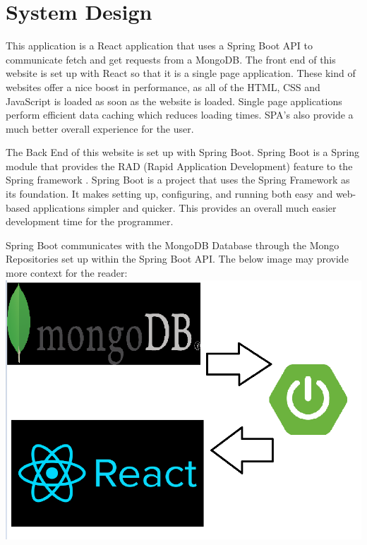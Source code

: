 \chapter{System Design}
This application is a React application that uses a Spring Boot API to communicate fetch and get requests from a MongoDB. The front end of this website is set up with React so that it is a single page application. These kind of websites offer a nice boost in performance, as all of the HTML, CSS and JavaScript is loaded as soon as the website is loaded. Single page applications perform efficient data caching which reduces loading times. SPA's also provide a much better overall experience for the user. \par
The Back End of this website is set up with Spring Boot. Spring Boot is a Spring module that provides the RAD (Rapid Application Development) feature to the Spring framework \cite{Javapoint}. Spring Boot is a project that uses the Spring Framework as its foundation.
It makes setting up, configuring, and running both easy and web-based applications simpler and quicker. This provides an overall much easier development time for the programmer. \par
Spring Boot communicates with the MongoDB Database through the Mongo Repositories set up within the Spring Boot API. The below image may provide more context for the reader: \newline
\includegraphics[scale=0.5]{img/architecture.png}

